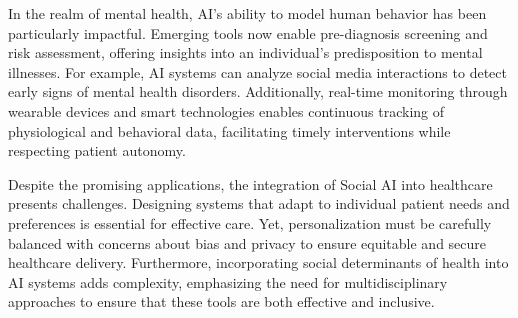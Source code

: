In the realm of mental health, AI's ability to model human behavior has been particularly impactful. Emerging tools now enable pre-diagnosis screening and risk assessment, offering insights into an individual’s predisposition to mental illnesses. For example, AI systems can analyze social media interactions to detect early signs of mental health disorders. Additionally, real-time monitoring through wearable devices and smart technologies enables continuous tracking of physiological and behavioral data, facilitating timely interventions while respecting patient autonomy.

Despite the promising applications, the integration of Social AI into healthcare presents challenges. Designing systems that adapt to individual patient needs and preferences is essential for effective care. Yet, personalization must be carefully balanced with concerns about bias and privacy to ensure equitable and secure healthcare delivery. Furthermore, incorporating social determinants of health into AI systems adds complexity, emphasizing the need for multidisciplinary approaches to ensure that these tools are both effective and inclusive.



    



